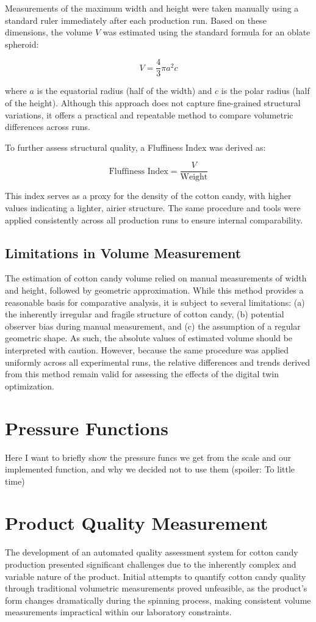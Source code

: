Measurements of the maximum width and height were taken manually using a standard ruler immediately after each production run. Based on these dimensions, the volume \( V \) was estimated using the standard formula for an oblate spheroid:

\[
V = \frac{4}{3} \pi a^2 c
\]

where \( a \) is the equatorial radius (half of the width) and \( c \) is the polar radius (half of the height). Although this approach does not capture fine-grained structural variations, it offers a practical and repeatable method to compare volumetric differences across runs.

To further assess structural quality, a Fluffiness Index was derived as:

\[
\text{Fluffiness Index} = \frac{V}{\text{Weight}}
\]

This index serves as a proxy for the density of the cotton candy, with higher values indicating a lighter, airier structure. The same procedure and tools were applied consistently across all production runs to ensure internal comparability.

\subsection{Limitations in Volume Measurement}

The estimation of cotton candy volume relied on manual measurements of width and height, followed by geometric approximation. While this method provides a reasonable basis for comparative analysis, it is subject to several limitations: (a) the inherently irregular and fragile structure of cotton candy, (b) potential observer bias during manual measurement, and (c) the assumption of a regular geometric shape. As such, the absolute values of estimated volume should be interpreted with caution. However, because the same procedure was applied uniformly across all experimental runs, the relative differences and trends derived from this method remain valid for assessing the effects of the digital twin optimization.

\section{Pressure Functions}
Here I want to briefly show the pressure funcs we get from the scale and our implemented function, and why we decided not to use them (spoiler: To little time)


\section{Product Quality Measurement}
The development of an automated quality assessment system for cotton candy production presented significant challenges due to the inherently complex and variable nature of the product. Initial attempts to quantify cotton candy quality through traditional volumetric measurements proved unfeasible, as the product's form changes dramatically during the spinning process, making consistent volume measurements impractical within our laboratory constraints.

